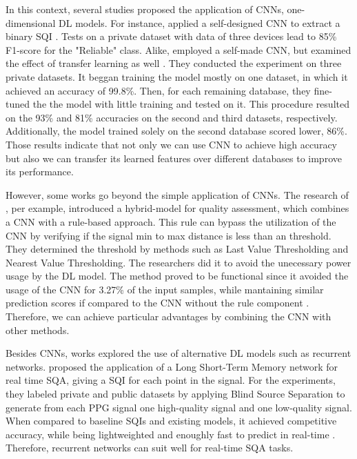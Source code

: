 In this context, several studies proposed the application of \acrshort{CNN}s, one-dimensional \acrshort{DL} models. For instance, \citeauthor{review-8} applied a self-designed \acrshort{CNN} to extract a binary \acrshort{SQI} \cite{review-8}. Tests on a private dataset with data of three devices lead to 85\% F1-score for the "Reliable" class. Alike, \citeauthor{review-9} employed a self-made \acrshort{CNN}, but examined the effect of transfer learning as well \cite{review-9}. They conducted the experiment on three private datasets. It beggan training the model mostly on one dataset, in which it achieved an accuracy of 99.8\%. Then, for each remaining database, they fine-tuned the the model with little training and tested on it. This procedure resulted on the 93\% and 81\% accuracies on the second and third datasets, respectively. Additionally, the model trained solely on the second database scored lower, 86\%. Those results indicate that not only we can use \acrshort{CNN} to achieve high accuracy but also we can transfer its learned features over different databases to improve its performance.

However, some works go beyond the simple application of \acrshort{CNN}s. The research of \citeauthor{review-10}, per example, introduced a hybrid-model for quality assessment, which combines a \acrshort{CNN} with a rule-based approach. This rule can bypass the utilization of the \acrshort{CNN} by verifying if the signal min to max distance is less than an threshold. They determined the threshold by methods such as Last Value Thresholding and Nearest Value Thresholding. The researchers did it to avoid the unecessary power usage by the \acrshort{DL} model. The method proved to be functional since it avoided the usage of the \acrshort{CNN} for 3.27\% of the input samples, while mantaining similar prediction scores if compared to the \acrshort{CNN} without the rule component \cite{review-10}. Therefore, we can achieve particular advantages by combining the \acrshort{CNN} with other methods.  

Besides \acrshort{CNN}s, works explored the use of alternative \acrshort{DL} models such as recurrent networks. \citeauthor{review-11} proposed the application of a Long Short-Term Memory network for real time \acrshort{SQA}, giving a \acrshort{SQI} for each point in the signal. For the experiments, they labeled private and public datasets by applying Blind Source Separation to generate from each \acrshort{PPG} signal one high-quality signal and one low-quality signal. When compared to baseline \acrshort{SQI}s and existing models, it achieved competitive accuracy, while being lightweighted and enoughly fast to predict in real-time \cite{review-11}. Therefore, recurrent networks can suit well for real-time \acrshort{SQA} tasks.

